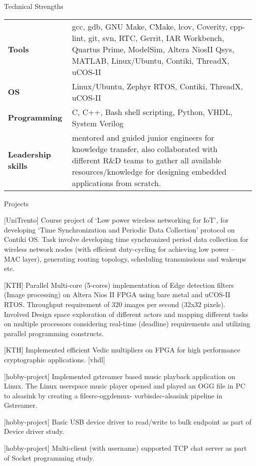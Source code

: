 \documentclass[
	11pt, %
]{resume} %
\begin{document}
\begin{rSection}{Technical Strengths}

	\begin{tabular}[t]{m{3cm} m{14cm}}
		\textbf{Tools} & gcc, gdb, GNU Make, CMake, lcov, Coverity, cpp-lint, git, svn, RTC, Gerrit, IAR
Workbench, Quartus Prime, ModelSim, Altera NiosII Qsys, MATLAB, Linux/Ubuntu, Contiki, ThreadX, uCOS-II \\
            \textbf{OS} & Linux/Ubuntu, Zephyr RTOS, Contiki, ThreadX, uCOS-II \\
            \textbf{Programming} & C, C++, Bash shell scripting, Python, VHDL, System Verilog \\
		\textbf{Leadership skills} & mentored and guided junior engineers for knowledge transfer, also collaborated with different R\&D teams to gather all available resources/knowledge for designing embedded applications from scratch.

	\end{tabular}
 
\end{rSection}


\begin{rSection}{Projects}

        \item {[UniTrento]} Course project of ‘Low power wireless networking for IoT’, for developing ‘Time Synchronization and Periodic Data Collection’ protocol on Contiki OS. Task involve developing time synchronized period data collection for wireless network nodes (with efficient duty-cycling for achieving low power – MAC layer), generating routing topology, scheduling transmissions and wakeups etc.
        \item {[KTH]} Parallel Multi-core (5-cores) implementation of Edge detection filters (Image processing) on Altera Nios II FPGA using bare metal and uCOS-II RTOS. Throughput requirement of 320 images per second (32x32 pixels). Involved Design space exploration of different actors and mapping different tasks on multiple processors considering real-time (deadline) requirements and utilizing parallel programming constructs.
        \item {[KTH]} Implemented efficient Vedic multipliers on FPGA for high performance cryptographic applications. {[vhdl]}
        \item {[hobby-project]} Implemented gstreamer based music playback application on Linux. The Linux userspace music player opened and played an OGG file in PC to alsasink by creating a filesrc-oggdemux- vorbisdec-alsasink pipeline in Gstreamer.
        \item {[hobby-project]} Basic USB device driver to read/write to bulk endpoint as part of Device driver study.
        \item {[hobby-project]} Multi-client (with username) supported TCP chat server as part of Socket programming study.

\end{rSection}
\end{document}
